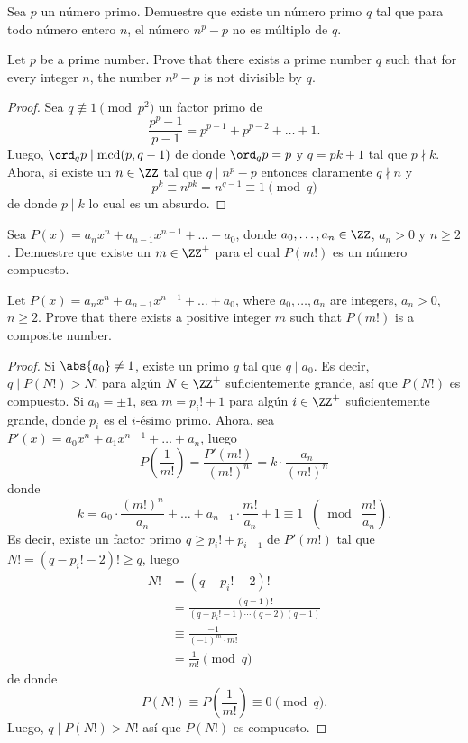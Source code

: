 \begin{probEG}
  Sea $p$ un número primo. Demuestre que existe un número primo $q$ tal que para
  todo número entero $n$, el número $n^p-p$ no es múltiplo de $q$.
  \begin{hint}
    Let $p$ be a prime number. Prove that there exists a prime number $q$ such
    that for every integer $n$, the number $n^p-p$ is not divisible by $q$.
  \end{hint}
\end{probEG}

\begin{proof}
  Sea $q\not\equiv 1\pmod{p^2}$ un factor primo de
  \[\frac{p^p-1}{p-1}=p^{p-1}+p^{p-2}+\dots+1.\]
  Luego, $\ord_qp\mid\mcd(p,q-1)$ de donde $\ord_qp=p$ y $q=pk+1$ tal que
  $p\nmid k$. Ahora, si existe un $n\in\ZZ$ tal que $q\mid n^p-p$ entonces
  claramente $q\nmid n$ y
  \[p^k\equiv n^{pk}=n^{q-1}\equiv 1\pmod q\]
  de donde $p\mid k$ lo cual es un absurdo.
\end{proof}

\begin{probMG}[ISL 2005/N7]
  Sea $P(x)=a_nx^n+a_{n-1}x^{n-1}+\dots+a_0$, donde $a_0,\dots,a_n\in\ZZ$,
  $a_n>0$ y $n\ge 2$. Demuestre que existe un $m\in\ZZ^+$ para el cual $P(m!)$
  es un número compuesto.
  \begin{hint}
    Let $P(x)=a_nx^n+a_{n-1}x^{n-1}+\dots+a_0$, where $a_0,\dots,a_n$ are
    integers, $a_n>0$, $n\ge 2$. Prove that there exists a positive integer $m$
    such that $P(m!)$ is a composite number.
  \end{hint}
\end{probMG}

\begin{proof}
  Si $\abs{a_0}\ne 1$, existe un primo $q$ tal que $q\mid a_0$. Es decir,
  $q\mid P(N!)>N!$ para algún $N\in\ZZ^+$ suficientemente grande, así que
  $P(N!)$ es compuesto. Si $a_0=\pm 1$, sea $m=p_i!+1$ para algún $i\in\ZZ^+$
  suficientemente grande, donde $p_i$ es el $i$-ésimo primo. Ahora, sea
  $P'(x)=a_0x^n+a_1x^{n-1}+\dots+a_n$, luego
  \[P\left(\frac{1}{m!}\right)=\frac{P'(m!)}{(m!)^n}=k\cdot\frac{a_n}{(m!)^n}\]
  donde
  \[
    k
    =a_0\cdot\frac{(m!)^n}{a_n}+\dots+a_{n-1}\cdot\frac{m!}{a_n}+1
    \equiv 1\;\;\left(\bmod\ \frac{m!}{a_n}\right).
  \]
  Es decir, existe un factor primo $q\ge p_i!+p_{i+1}$ de $P'(m!)$ tal que
  $N!=(q-p_i!-2)!\ge q$, luego
  \begin{align*}
    N!
    &= (q-p_i!-2)! \\
    &= \frac{(q-1)!}{(q-p_i!-1)\cdots(q-2)(q-1)} \\
    &\equiv \frac{-1}{(-1)^m\cdot m!} \\
    &= \frac{1}{m!}\pmod q
  \end{align*}
  de donde
  \[P(N!)\equiv P\left(\frac{1}{m!}\right)\equiv 0\pmod q.\]
  Luego, $q\mid P(N!)>N!$ así que $P(N!)$ es compuesto.
\end{proof}

